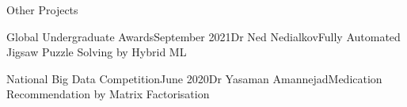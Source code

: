 \begin{rSection}{Other Projects}

  \begin{rSubsection}{Global Undergraduate Awards}{September 2021}{Dr Ned Nedialkov}{Fully Automated Jigsaw Puzzle Solving by Hybrid ML}
  \end{rSubsection}
  
  \begin{rSubsection}{National Big Data Competition}{June 2020}{Dr Yasaman Amannejad}{Medication Recommendation by Matrix Factorisation}
  \end{rSubsection}
  
  
  

\end{rSection}
